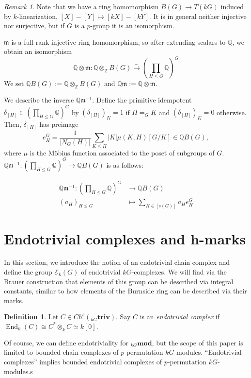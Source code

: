 \documentclass[10pt,letterpaper, boxed, cm]{amsart}
\newcommand{\Z}{\mathbb{Z}}
\newcommand{\Q}{\mathbb{Q}}
\newcommand{\inv}{^{-1}}
\newcommand{\End}{\operatorname{End}}
\newcommand{\triv}{\mathbf{triv}}
\newcommand{\calE}{\mathcal{E}}
\theoremstyle{remark}
\newtheorem{remark}[theorem]{Remark}
\theoremstyle{definition}
\newtheorem{definition}[theorem]{Definition}
\begin{document}
	\begin{remark}\label{burnsideringmarkhominverse}
		Note that we have a ring homomorphism $B(G) \to T(kG)$ induced by $k$-linearization, $[X] - [Y] \mapsto [kX] - [kY]$. It is in general neither injective nor surjective, but if $G$ is a $p$-group it is an isomorphism.

		$\mathfrak{m}$ is a full-rank injective ring homomorphism, so after extending scalars to $\Q$, we obtain an isomorphism
		\[\Q\otimes \mathfrak{m}: \Q \otimes_\Z B(G) \xrightarrow[]{\sim} \left(\prod_{H\leq G} \Q\right)^G\] We set $\Q B(G) := \Q \otimes_\Z B(G)$ and $\Q \mathfrak{m} := \Q \otimes \mathfrak{m}$.

		We describe the inverse $\Q \mathfrak{m}\inv$. Define the primitive idempotent $\delta_{[H]} \in \left(\prod_{H\leq G}\Q \right)^G$ by $(\delta_{[H]})_K = 1$ if $H =_G K$ and $(\delta_{[H]})_K = 0$ otherwise. Then, $\delta_{[H]}$ has preimage
		\[e^G_H =\frac{1}{|N_G(H)|}\sum_{K\leq H} |K|\mu(K, H) [G/K] \in \Q B(G), \] where $\mu$ is the M\"{o}bius function associated to the poset of subgroups of $G$. $\Q \mathfrak{m}\inv: \left(\prod_{H\leq G}\Q\right)^G \to \Q B(G)$ is as follows:

		\begin{align*}
		\Q \mathfrak{m}\inv: \left(\prod_{H\leq G}\Q\right)^G &\to \Q B(G)\\
		(a_H)_{H\leq G} &\mapsto \sum_{H \in [s(G)]} a_H e^G_H
		\end{align*}

	\end{remark}

	\section{Endotrivial complexes and h-marks} \label{endotrivialintroduction}

	In this section, we introduce the notion of an endotrivial chain complex and define the group $\calE_k(G)$ of endotrivial $kG$-complexes. We will find via the Brauer construction that elements of this group can be described via integral constants, similar to how elements of the Burnside ring can be described via their marks.

	\begin{definition}
		Let $C \in Ch^b({}_{kG}\triv)$. Say $C$ is an \textit{endotrivial complex} if $\End_k(C) \cong C^* \otimes_k C \simeq k[0]$.
	\end{definition}

	Of course, we can define endotriviality for ${}_{kG}\mathbf{mod}$, but the scope of this paper is limited to bounded chain complexes of $p$-permutation $kG$-modules. ``Endotrivial complexes'' implies bounded endotrivial complexes of $p$-permutation $kG$-modules.s
\end{document}
